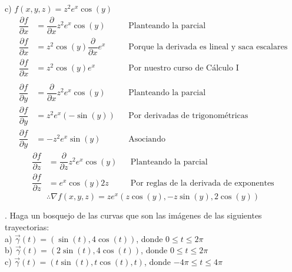 \documentclass[letterpaper]{article}
\renewcommand{\d}{\partial}
\renewcommand{\*}{\cdot}
\theoremstyle{definition}
\begin{document}
\noindent c) $f(x,y,z) = z^2e^x\cos(y)$
\begin{align*}
	\dfrac{\d f}{\d x} &= \dfrac{\d}{\d x} z^2e^x\cos(y) &&\text{Planteando la parcial}\\
	\dfrac{\d f}{\d x} &= z^2\cos(y)\dfrac{\d}{\d x} e^x &&\text{Porque la derivada es lineal y saca escalares}\\
	\dfrac{\d f}{\d x} &= z^2\cos(y)e^x &&\text{Por nuestro curso de Cálculo I}\\
	\\
	\dfrac{\d f}{\d y} &= \dfrac{\d}{\d x} z^2e^x\cos(y) &&\text{Planteando la parcial}\\
	\dfrac{\d f}{\d y} &= z^2e^x(-\sin(y)) &&\text{Por derivadas de trigonométricas}\\
	\dfrac{\d f}{\d y} &= -z^2e^x\sin(y) &&\text{Asociando }
\end{align*}
\begin{align*}
		\dfrac{\d f}{\d z} &= \dfrac{\d}{\d z} z^2e^x\cos(y) &&\text{Planteando la parcial}\\
	\dfrac{\d f}{\d z} &= e^x\cos(y)2z &&\text{Por reglas de la derivada de exponentes}
\end{align*}
\[ \therefore \nabla f(x,y,z) = ze^x(z\cos(y), -z\sin(y), 2\cos(y)) \]



. Haga un bosquejo de las curvas que son las imágenes de las siguientes trayectorias:\\


\noindent a) $\vec{\gamma}(t) = (\sin(t), 4\cos(t))$, donde $0 \leq t \leq 2\pi$\\

\noindent b) $\vec{\gamma}(t) = (2\sin(t), 4\cos(t))$, donde $0 \leq t \leq 2\pi$\\

\noindent c) $\vec{\gamma}(t) = (t\sin(t), t\cos(t), t)$, donde $ -4\pi \leq t \leq 4\pi$\\
\end{document}
